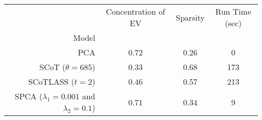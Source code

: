 \begin{tabular}{r|ccc}
\toprule
{} &  Concentration of EV &  Sparsity & Run Time (sec) \\
Model                                        &                      &           &                \\
\midrule
PCA                                          &                 0.72 &      0.26 &              0 \\
SCoT ($\theta = 685$)                        &                 0.33 &      0.68 &            173 \\
SCoTLASS ($t = 2$)                           &                 0.46 &      0.57 &            213 \\
SPCA ($\lambda_1=0.001$ and $\lambda_2=0.1$) &                 0.71 &      0.34 &              9 \\
\bottomrule
\end{tabular}
